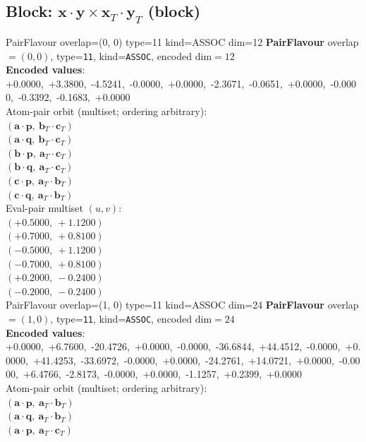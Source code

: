 \documentclass[a4paper,11pt]{article}
\newcommand{\pdcegfomjfhook}[2]{\mathbf{#1} \cdot \mathbf{#2}}
\newcommand{\fpbeomcfokjooi}[2]{\mathbf{#1}_T \cdot \mathbf{#2}_T}
\begin{document}
\subsection{Block: $\pdcegfomjfhook{x}{y} \times \fpbeomcfokjooi{x}{y}$  (block)}
    PairFlavour  overlap=(0, 0)  type=11  kind=ASSOC  dim=12
\textbf{PairFlavour} overlap$=(0, 0)$, type=\texttt{11}, kind=\texttt{ASSOC}, encoded dim$=12$\\
\textbf{      Encoded values}: +0.0000,\ +3.3800,\ -4.5241,\ -0.0000,\ +0.0000,\ -2.3671,\ -0.0651,\ +0.0000,\ -0.0000,\ -0.3392,\ -0.1683,\ +0.0000\\
\quad Atom-pair orbit (multiset; ordering arbitrary):\\
$(\pdcegfomjfhook{a}{p},\ \fpbeomcfokjooi{b}{c})$\\
$(\pdcegfomjfhook{a}{q},\ \fpbeomcfokjooi{b}{c})$\\
$(\pdcegfomjfhook{b}{p},\ \fpbeomcfokjooi{a}{c})$\\
$(\pdcegfomjfhook{b}{q},\ \fpbeomcfokjooi{a}{c})$\\
$(\pdcegfomjfhook{c}{p},\ \fpbeomcfokjooi{a}{b})$\\
$(\pdcegfomjfhook{c}{q},\ \fpbeomcfokjooi{a}{b})$\\
\quad Eval-pair multiset $(u, v)$:\\
$(+0.5000,\ +1.1200)$\\
$(+0.7000,\ +0.8100)$\\
$(-0.5000,\ +1.1200)$\\
$(-0.7000,\ +0.8100)$\\
$(+0.2000,\ -0.2400)$\\
$(-0.2000,\ -0.2400)$\\
    PairFlavour  overlap=(1, 0)  type=11  kind=ASSOC  dim=24
\textbf{PairFlavour} overlap$=(1, 0)$, type=\texttt{11}, kind=\texttt{ASSOC}, encoded dim$=24$\\
\textbf{      Encoded values}: +0.0000,\ +6.7600,\ -20.4726,\ +0.0000,\ -0.0000,\ -36.6844,\ +44.4512,\ -0.0000,\ +0.0000,\ +41.4253,\ -33.6972,\ -0.0000,\ +0.0000,\ -24.2761,\ +14.0721,\ +0.0000,\ -0.0000,\ +6.4766,\ -2.8173,\ -0.0000,\ +0.0000,\ -1.1257,\ +0.2399,\ +0.0000\\
\quad Atom-pair orbit (multiset; ordering arbitrary):\\
$(\pdcegfomjfhook{a}{p},\ \fpbeomcfokjooi{a}{b})$\\
$(\pdcegfomjfhook{a}{q},\ \fpbeomcfokjooi{a}{b})$\\
$(\pdcegfomjfhook{a}{p},\ \fpbeomcfokjooi{a}{c})$\\
\end{document}
